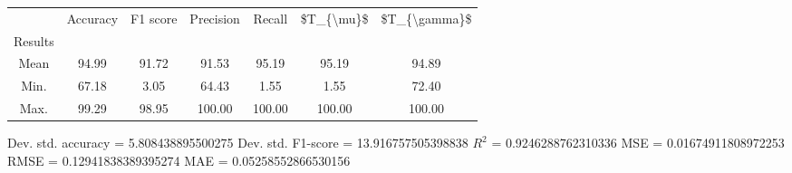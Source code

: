 \begin{tabular}{|c|c|c|c|c|c|c|}
\toprule
{} &  Accuracy &  F1 score &  Precision &  Recall &  \$T\_\{\textbackslash mu\}\$ &  \$T\_\{\textbackslash gamma\}\$ \\
Results &           &           &            &         &            &               \\
\hline
Mean    &     94.99 &     91.72 &      91.53 &   95.19 &      95.19 &         94.89 \\
Min.    &     67.18 &      3.05 &      64.43 &    1.55 &       1.55 &         72.40 \\
Max.    &     99.29 &     98.95 &     100.00 &  100.00 &     100.00 &        100.00 \\
\bottomrule
\end{tabular}

 Dev. std. accuracy = 5.808438895500275
 Dev. std. F1-score = 13.916757505398838
 $R^2$ = 0.9246288762310336
 MSE = 0.01674911808972253
 RMSE = 0.12941838389395274
 MAE = 0.05258552866530156